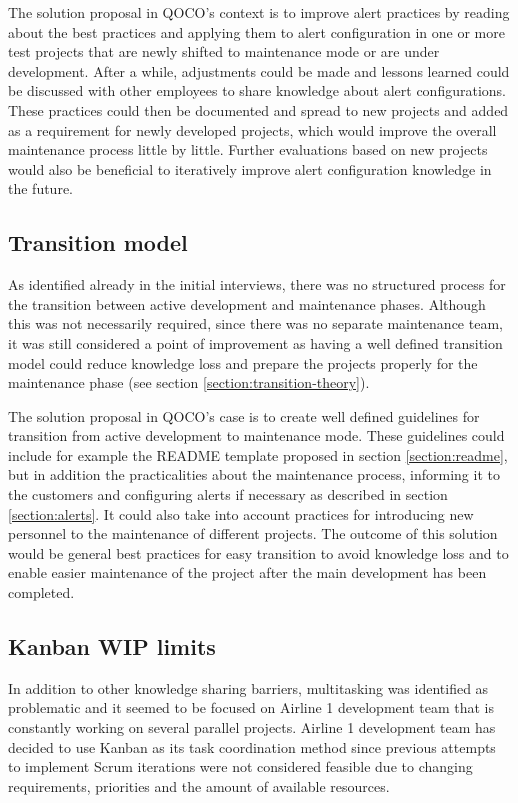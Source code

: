 The solution proposal in QOCO's context is to improve alert practices by reading about the best practices and applying them to alert configuration in one or more test projects that
are newly shifted to maintenance mode or are under development. After a while, adjustments could be made and lessons learned could be discussed with other employees to share knowledge
about alert configurations. These practices could then be documented and spread to new projects and added as a requirement for newly developed projects, which would improve the overall
maintenance process little by little. Further evaluations based on new projects would also be beneficial to iteratively improve alert configuration knowledge in the future.

\subsection{Transition model}

As identified already in the initial interviews, there was no structured process for the transition between active development and maintenance phases. Although this was not necessarily
required, since there was no separate maintenance team, it was still considered a point of improvement as having a well defined transition model could reduce knowledge loss
and prepare the projects properly for the maintenance phase (see section \ref{section:transition-theory}).

The solution proposal in QOCO's case is to create well defined guidelines for transition from active development to maintenance mode. These guidelines could include for example
the README template proposed in section \ref{section:readme}, but in addition the practicalities about the maintenance process, informing it to the customers and configuring alerts if necessary
as described in section \ref{section:alerts}. It could also take into account practices for introducing new personnel to the maintenance of different projects.
The outcome of this solution would be general best practices for easy transition to avoid knowledge loss and to enable easier maintenance
of the project after the main development has been completed. 

\subsection{Kanban WIP limits}

In addition to other knowledge sharing barriers, multitasking was identified as problematic and it seemed to be focused on Airline 1 development team that is constantly working on several
parallel projects. Airline 1 development team has decided to use Kanban as its task coordination method since previous attempts to implement Scrum iterations were not considered feasible
due to changing requirements, priorities and the amount of available resources.

